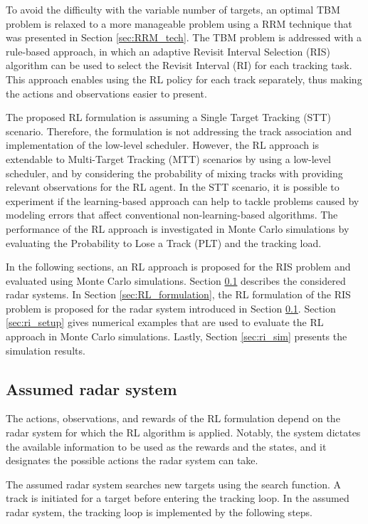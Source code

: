 \documentclass[english, 12pt, a4paper, elec, utf8, a-1b, online]{aaltothesis}
\numberwithin{equation}{section}
\begin{document}
To avoid the difficulty with the variable number of targets, an optimal TBM problem is relaxed to a more manageable problem using a RRM technique that was presented in Section \ref{sec:RRM_tech}.
The TBM problem is addressed with a rule-based approach, in which an adaptive Revisit Interval Selection (RIS) algorithm can be used to select the Revisit Interval (RI) for each tracking task.
This approach enables using the RL policy for each track separately, thus making the actions and observations easier to present.

The proposed RL formulation is assuming a Single Target Tracking (STT) scenario. 
Therefore, the formulation is not addressing the track association and implementation of the low-level scheduler.
However, the RL approach is extendable to Multi-Target Tracking (MTT) scenarios by using a low-level scheduler, and by considering the probability of mixing tracks with providing relevant observations for the RL agent.
In the STT scenario, it is possible to experiment if the learning-based approach can help to tackle problems caused by modeling errors that affect conventional non-learning-based algorithms.
The performance of the RL approach is investigated in Monte Carlo simulations by evaluating the Probability to Lose a Track (PLT) and the tracking load.

In the following sections, an RL approach is proposed for the RIS problem and evaluated using Monte Carlo simulations.
Section \ref{sec:system_description} describes the considered radar systems.
In Section \ref{sec:RL_formulation}, the RL formulation of the RIS problem is proposed for the radar system introduced in Section \ref{sec:system_description}.
Section \ref{sec:ri_setup} gives numerical examples that are used to evaluate the RL approach in Monte Carlo simulations. 
Lastly, Section \ref{sec:ri_sim} presents the simulation results.


\subsection{Assumed radar system} \label{sec:system_description}

The actions, observations, and rewards of the RL formulation depend on the radar system for which the RL algorithm is applied.
Notably, the system dictates the available information to be used as the rewards and the states, and it designates the possible actions the radar system can take.
 
The assumed radar system searches new targets using the search function. 
A track is initiated for a target before entering the tracking loop. 
In the assumed radar system, the tracking loop is implemented by the following steps.
\end{document}
